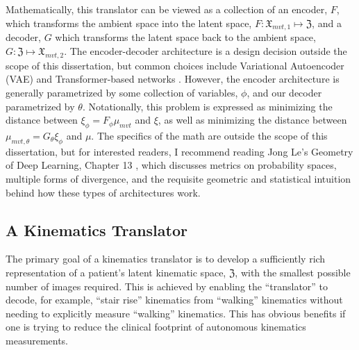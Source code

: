 Mathematically, this translator can be viewed as a collection of an encoder, $F$, which transforms the ambient space into the latent space, $F: \mathfrak{X}_{mvt,1} \mapsto \mathfrak{Z}$, and a decoder, $G$ which transforms the latent space back to the ambient space, $G: \mathfrak{Z} \mapsto \mathfrak{X}_{mvt,2}$. The encoder-decoder architecture is a design decision outside the scope of this dissertation, but common choices include Variational Autoencoder (VAE) and Transformer-based networks \cite{vaswaniAttentionAllYou2017}.
However, the encoder architecture is generally parametrized by some collection of variables, $\phi$, and our decoder parametrized by $\theta$.
Notationally, this problem is expressed as minimizing the distance between $\xi_{\phi} = F_{\phi}\mu_{mvt}$ and $\xi$, as well as minimizing the distance between $\mu_{mvt,\theta} = G_{\theta}\xi_{\phi}$ and $\mu$.
The specifics of the math are outside the scope of this dissertation, but for interested readers, I recommend reading Jong Le's Geometry of Deep Learning, Chapter 13 \cite{yeGeometryDeepLearning2022}, which discusses metrics on probability spaces, multiple forms of divergence, and the requisite geometric and statistical intuition behind how these types of architectures work.

\subsection{A Kinematics Translator}
The primary goal of a kinematics translator is to develop a sufficiently rich representation of a patient's latent kinematic space, $\mathfrak{Z}$, with the smallest possible number of images required.
This is achieved by enabling the ``translator'' to decode, for example, ``stair rise'' kinematics from ``walking'' kinematics without needing to explicitly measure ``walking'' kinematics.
This has obvious benefits if one is trying to reduce the clinical footprint of autonomous kinematics measurements.

